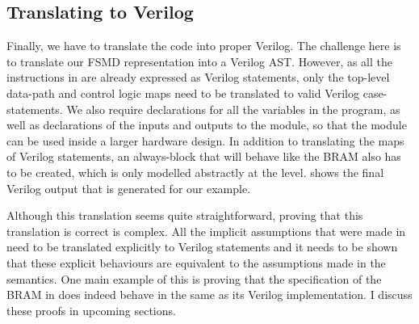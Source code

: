 \subsection{Translating \htl{} to Verilog}

Finally, we have to translate the \htl{} code into proper
Verilog. %
The challenge here is to translate our FSMD representation into a Verilog AST.
However, as all the instructions in \htl{} are already expressed as Verilog
statements, only the top-level data-path and control logic maps need to be
translated to valid Verilog case-statements.  We also require declarations for
all the variables in the program, as well as declarations of the inputs and
outputs to the module, so that the module can be used inside a larger hardware
design.  In addition to translating the maps of Verilog statements, an
always-block that will behave like the \gls{BRAM} also has to be created, which
is only modelled abstractly at the \htl{} level.   shows
the final Verilog output that is generated for our example.

Although this translation seems quite straight\-forward, proving that this
translation is correct is complex.  All the implicit assumptions that were made
in \htl{} need to be translated explicitly to Verilog statements and it needs to
be shown that these explicit behaviours are equivalent to the assumptions made
in the \htl{} semantics.  One main example of this is proving that the
specification of the \gls{BRAM} in \htl{} does indeed behave in the same as its
Verilog implementation.  I discuss these proofs in upcoming sections.



